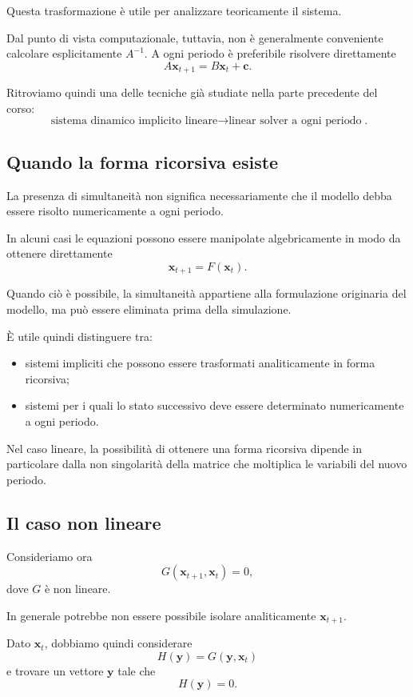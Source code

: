 \documentclass{book}
\begin{document}
Questa trasformazione è utile per analizzare teoricamente il sistema.

Dal punto di vista computazionale, tuttavia, non è generalmente conveniente
calcolare esplicitamente $A^{-1}$. A ogni periodo è preferibile risolvere
direttamente
\[
A\mathbf{x}_{t+1}
=
B\mathbf{x}_t+\mathbf{c}.
\]

Ritroviamo quindi una delle tecniche già studiate nella parte precedente
del corso:
\[
\boxed{
\text{sistema dinamico implicito lineare}
\longrightarrow
\text{linear solver a ogni periodo}
}.
\]


\subsection{Quando la forma ricorsiva esiste}

La presenza di simultaneità non significa necessariamente che il modello
debba essere risolto numericamente a ogni periodo.

In alcuni casi le equazioni possono essere manipolate algebricamente in
modo da ottenere direttamente
\[
\mathbf{x}_{t+1}=F(\mathbf{x}_t).
\]

Quando ciò è possibile, la simultaneità appartiene alla formulazione
originaria del modello, ma può essere eliminata prima della simulazione.

È utile quindi distinguere tra:

\begin{itemize}
    \item sistemi impliciti che possono essere trasformati analiticamente
    in forma ricorsiva;
    \item sistemi per i quali lo stato successivo deve essere determinato
    numericamente a ogni periodo.
\end{itemize}

Nel caso lineare, la possibilità di ottenere una forma ricorsiva dipende
in particolare dalla non singolarità della matrice che moltiplica le
variabili del nuovo periodo.


\subsection{Il caso non lineare}

Consideriamo ora
\[
G(\mathbf{x}_{t+1},\mathbf{x}_t)=0,
\]
dove $G$ è non lineare.

In generale potrebbe non essere possibile isolare analiticamente
$\mathbf{x}_{t+1}$.

Dato $\mathbf{x}_t$, dobbiamo quindi considerare
\[
H(\mathbf{y})
=
G(\mathbf{y},\mathbf{x}_t)
\]
e trovare un vettore $\mathbf{y}$ tale che
\[
H(\mathbf{y})=0.
\]
\end{document}
